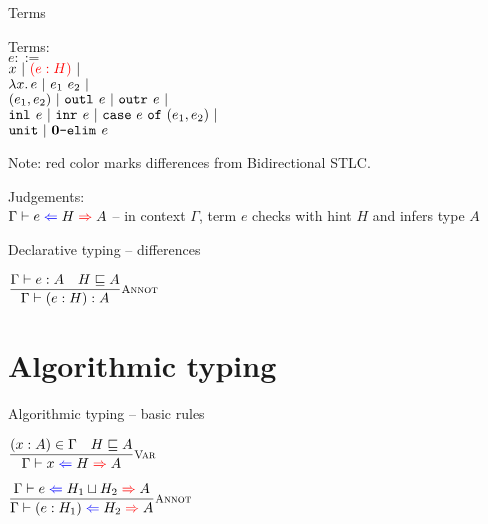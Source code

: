 \documentclass{beamer}
\begin{document}
\begin{frame}{Terms}

Terms: \\
$e ::=$ \\
\qquad $x \pipe \termdiff{\annot{e}{H}} \pipe $ \\
\qquad $\fun{x}{e} \pipe \app{e_1}{e_2} \pipe$ \\
\qquad $(e_1, e_2) \ |\  \texttt{outl}_{}\ e \ |\  \texttt{outr}_{}\ e \ |\ $ \\
\qquad $\texttt{inl}_{}\ e \ |\  \texttt{inr}_{}\ e \ |\  \texttt{case}\ e\ \texttt{of}\ (e_1, e_2) \ |\ $ \\
\qquad $\texttt{unit} \ |\  \textbf{0}\texttt{-elim}_{}\ e$

\vspace{2em}

Note: red color marks differences from Bidirectional STLC.

\vspace{2em}

Judgements: \\
$\hinting[\Gamma]{e}{H}{A}$ -- in context $\Gamma$, term $e$ checks with hint $H$ and infers type $A$

\end{frame}

\begin{frame}{Declarative typing -- differences}

\begin{center}
  $\infrule[Annot]{\typing{e}{A} \quad \sidecond{\hintorder{H}{A}}}{\typing{\annot{e}{H}}{A}}$
\end{center}

\end{frame}

\section{Algorithmic typing}

\begin{frame}{Algorithmic typing -- basic rules}

\begin{center}
  $\infrule[Var]{\sidecond{(x : A) \in \Gamma} \quad \sidecond{\hintorder{H}{A}}}{\hinting{x}{H}{A}}$

  \vspace{2em}

  $\infrule[Annot]{\hinting{e}{\hintlub{H_1}{H_2}}{A}}{\hinting{\annot{e}{H_1}}{H_2}{A}}$
\end{center}

\end{frame}
\end{document}
